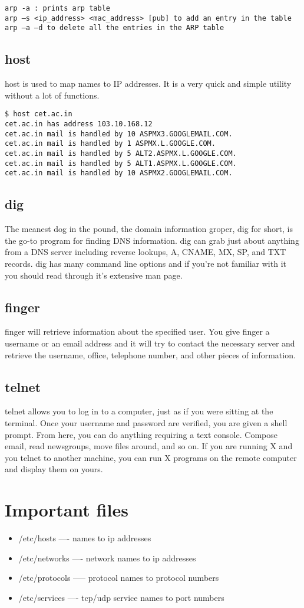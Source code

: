 \documentclass[a4paper,12pt]{article}
\begin{document}
 \begin{verbatim}
arp -a : prints arp table
arp –s <ip_address> <mac_address> [pub] to add an entry in the table
arp –a –d to delete all the entries in the ARP table
 \end{verbatim}

\subsection{host}
host is used to map names to IP addresses. It is a very quick and simple utility without a lot of functions.

\begin{verbatim}
$ host cet.ac.in
cet.ac.in has address 103.10.168.12
cet.ac.in mail is handled by 10 ASPMX3.GOOGLEMAIL.COM.
cet.ac.in mail is handled by 1 ASPMX.L.GOOGLE.COM.
cet.ac.in mail is handled by 5 ALT2.ASPMX.L.GOOGLE.COM.
cet.ac.in mail is handled by 5 ALT1.ASPMX.L.GOOGLE.COM.
cet.ac.in mail is handled by 10 ASPMX2.GOOGLEMAIL.COM.
\end{verbatim}

\subsection{dig}

The meanest dog in the pound, the domain information groper, dig for short, is the go-to program for finding DNS information. dig can grab just about anything from a DNS server including reverse lookups, A, CNAME, MX, SP, and TXT records. dig has many command line options and if you're not familiar with it you should read through it's extensive man page.


\subsection{finger}
finger will retrieve information about the specified user.
You give finger a username or an email address and it will try to contact the necessary
server and retrieve the username, office, telephone number, and other pieces of information.

\subsection{telnet}
telnet allows you to log in to a computer, just as if you were sitting at the terminal. Once your username and password are verified, you are given a shell prompt. From here, you can do anything requiring a text console. Compose email, read newsgroups, move files around, and so on. If you are running X and you telnet to another machine, you can run X programs on the remote computer and display them on yours.

\section{Important files}

\begin{itemize}
\item /etc/hosts —- names to ip addresses

\item /etc/networks —- network names to ip addresses

\item /etc/protocols —– protocol names to protocol numbers

\item  /etc/services —- tcp/udp service names to port numbers
\end{itemize}
\end{document}
